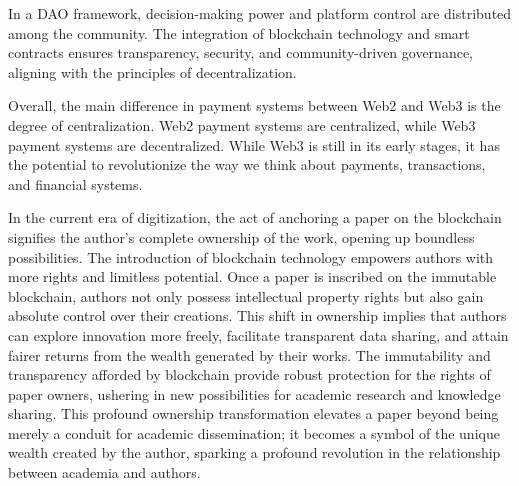 \documentclass[lettersize,journal]{IEEEtran}
\begin{document}
In a DAO framework, decision-making power and platform control are distributed among the community. The integration of blockchain technology and smart contracts ensures transparency, security, and community-driven governance, aligning with the principles of decentralization.


Overall, the main difference in payment systems between Web2 and Web3 is the degree of centralization. Web2 payment systems are centralized, while Web3 payment systems are decentralized. While Web3 is still in its early stages, it has the potential to revolutionize the way we think about payments, transactions, and financial systems.



In the current era of digitization, the act of anchoring a paper on the blockchain signifies the author's complete ownership of the work, opening up boundless possibilities. The introduction of blockchain technology empowers authors with more rights and limitless potential. Once a paper is inscribed on the immutable blockchain, authors not only possess intellectual property rights but also gain absolute control over their creations. This shift in ownership implies that authors can explore innovation more freely, facilitate transparent data sharing, and attain fairer returns from the wealth generated by their works. The immutability and transparency afforded by blockchain provide robust protection for the rights of paper owners, ushering in new possibilities for academic research and knowledge sharing. This profound ownership transformation elevates a paper beyond being merely a conduit for academic dissemination; it becomes a symbol of the unique wealth created by the author, sparking a profound revolution in the relationship between academia and authors.
\end{document}
